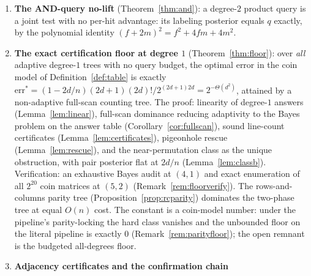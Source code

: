 \documentclass[11pt]{article}
\theoremstyle{definition}
\theoremstyle{remark}
\begin{document}
\begin{enumerate}
succeed at the base rate $f$ exactly); Proposition~\ref{prop:nonadaptsingle}
(non-adaptive single-variable trees with answer-seeking labels succeed at
most $f(1+s/2)+o(1)$); Proposition~\ref{prop:nonadaptall} (non-adaptive
trees whose queries are single variables or monomials with at most
$\gamma$ distinct variable pairs each succeed at most
$(\gamma s+1)f+o(1)$ at budget $s$, with the transition
$d=\Theta_\gamma(n^{2/3}(\log k)^{-1/3})$; the earlier all-queries
generality of this cap is \emph{retracted}, with a counterexample, in
Remark~\ref{rem:retraction}); Theorem~\ref{thm:B} (all adaptive
single-variable trees of depth $e$ succeed at most
$\max(q,f)(1+O(e/n))+o(1)$, where $q=\frac{2d^2+d}{2d^2-d+n}$ is the
exact per-hit Bayes posterior; in particular the success is at most
$\frac12+o(1)$ for $2d\le\sqrt{2n}$; the cap is a \emph{budgeted}
statement, Remark~\ref{rem:Bscope}).  Hence the chi-task hypothesis of
Theorem~\ref{thm:chi} holds for these classes with margin.
\item \textbf{The AND-query no-lift}
(Theorem~\ref{thm:and}): a degree-$2$ product query is a joint test with
no per-hit advantage: its labeling posterior equals $q$ exactly, by the
polynomial identity $(f+2m)^2=f^2+4fm+4m^2$.
\item \textbf{The exact certification floor at degree $1$}
(Theorem~\ref{thm:floor}): over \emph{all} adaptive degree-$1$ trees
with no query budget, the optimal error in the coin model of
Definition~\ref{def:table} is exactly
$\mathrm{err}^*=(1-2d/n)(2d+1)(2d)!/2^{(2d+1)2d}=2^{-\Theta(d^2)}$,
attained by a non-adaptive full-scan counting tree.  The proof:
linearity of degree-$1$ answers (Lemma~\ref{lem:linear}), full-scan
dominance reducing adaptivity to the Bayes problem on the answer table
(Corollary~\ref{cor:fullscan}), sound line-count certificates
(Lemma~\ref{lem:certificates}), pigeonhole rescue
(Lemma~\ref{lem:rescue}), and the near-permutation class as the unique
obstruction, with pair posterior flat at $2d/n$
(Lemma~\ref{lem:classb}).  Verification: an exhaustive Bayes audit at
$(4,1)$ and exact enumeration of all $2^{20}$ coin matrices at $(5,2)$
(Remark~\ref{rem:floorverify}).  The rows-and-columns parity tree
(Proposition~\ref{prop:rcparity}) dominates the two-phase tree at
equal $O(n)$ cost.  The constant is a coin-model number: under the
pipeline's parity-locking the hard class vanishes and the
unbounded floor on the literal pipeline is exactly $0$
(Remark~\ref{rem:parityfloor}); the open remnant is the budgeted
all-degrees floor.
\item \textbf{Adjacency certificates and the confirmation chain}

\end{enumerate}
\end{document}

